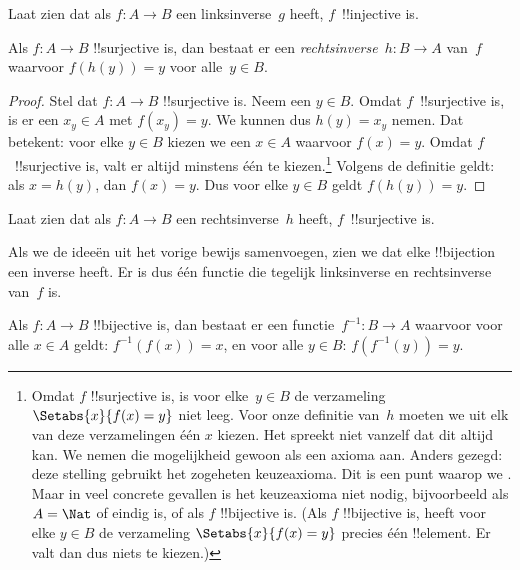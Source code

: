 \documentclass[openany]{memoir}
\begin{document}
\begin{prob}
Laat zien dat als $f\colon A \to B$ een linksinverse~$g$ heeft,
$f$~!!{injective} is.
\end{prob}

\begin{prop}
    Als $f\colon A \to B$ !!{surjective} is, dan bestaat er een
    \emph{rechtsinverse}~$h\colon B \to A$ van~$f$ waarvoor $f(h(y)) =
    y$ voor alle~$y \in B$.
\end{prop}

\begin{proof}
Stel dat $f\colon A \to B$ !!{surjective} is. Neem een $y \in B$.
Omdat $f$~!!{surjective} is, is er een $x_y \in A$ met $f(x_y) = y$.
We kunnen dus $h(y) = x_y$ nemen. Dat betekent: voor elke $y \in B$
kiezen we een $x \in A$ waarvoor $f(x) = y$. Omdat $f$~!!{surjective}
is, valt er altijd minstens één te kiezen.\footnote{Omdat $f$
!!{surjective} is, is voor elke~$y \in B$ de verzameling
$\Setabs{x}{f(x) = y}$ niet leeg. Voor onze definitie van~$h$ moeten
we uit elk van deze verzamelingen één $x$ kiezen. Het spreekt niet
vanzelf dat dit altijd kan. We nemen die mogelijkheid gewoon als een
axioma aan. Anders gezegd: deze stelling gebruikt het zogeheten
keuzeaxioma. Dit is een punt waarop we
.
Maar in veel concrete gevallen is het keuzeaxioma niet nodig,
bijvoorbeeld als $A = \Nat$ of eindig is, of als $f$ !!{bijective} is.
(Als $f$ !!{bijective} is, heeft voor elke $y \in B$ de verzameling
$\Setabs{x}{f(x) = y}$ precies één !!{element}.
Er valt dan dus niets te kiezen.)}
Volgens de definitie geldt: als $x = h(y)$, dan $f(x) = y$. Dus voor
elke $y \in B$ geldt $f(h(y)) = y$.
\end{proof}

\begin{prob}
Laat zien dat als $f\colon A \to B$ een rechtsinverse~$h$ heeft,
$f$~!!{surjective} is.
\end{prob}

\begin{explain}
  Als we de ideeën uit het vorige bewijs samenvoegen, zien we dat elke
  !!{bijection} een inverse heeft. Er is dus één functie die tegelijk
  linksinverse en rechtsinverse van~$f$ is.
\end{explain}

\begin{prop}
Als $f\colon A \to B$ !!{bijective} is, dan bestaat er een
functie~$f^{-1}\colon B \to A$ waarvoor voor alle $x \in A$ geldt:
$f^{-1}(f(x)) = x$, en voor alle $y \in B$: $f(f^{-1}(y)) = y$.
\end{prop}
\end{document}
